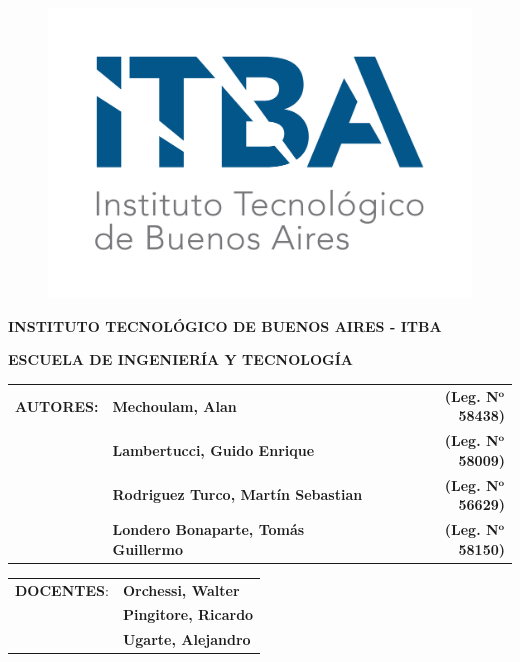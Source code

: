\begin{titlepage}


\begin{figure}[H]
	\includegraphics[width=0.3\linewidth, right]{./ITBA_1}
\end{figure}

\vspace*{1.5cm}

\noindent \textbf{INSTITUTO TECNOLÓGICO DE BUENOS AIRES - ITBA}

\noindent \textbf{ESCUELA DE INGENIERÍA Y TECNOLOGÍA}

\vspace*{4cm}


\vspace*{2.5cm}

\begin{tabular}{llr} 
	\textbf{AUTORES:} & \textbf{Mechoulam, Alan}  &  \textbf{(Leg. N}$\mathbf{^o}$ \textbf{58438)}\\
	 & \textbf{Lambertucci, Guido Enrique} & \textbf{(Leg. N}$\mathbf{^o}$ \textbf{58009)} \\
	 & \textbf{Rodriguez Turco, Martín Sebastian} & \textbf{(Leg. N}$\mathbf{^o}$ \textbf{56629)} \\
	 & \textbf{Londero Bonaparte, Tomás Guillermo} & \textbf{(Leg. N}$\mathbf{^o}$ \textbf{58150)} \\
\end{tabular}

\vspace*{1.5cm}

\begin{tabular}{ll}
	\textbf{DOCENTES}: & \textbf{Orchessi, Walter}\\
	 & \textbf{Pingitore, Ricardo} \\
	 & \textbf{Ugarte, Alejandro} \\
\end{tabular}

\end{titlepage}
